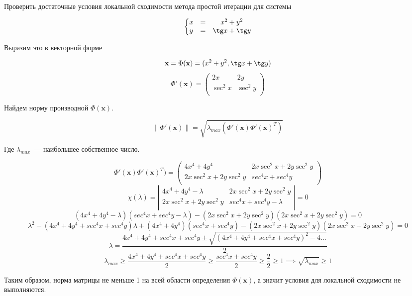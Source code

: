 \documentclass[11pt,a4paper,oneside]{article}
\newcommand{\norm}[1]{\left\lVert#1\right\rVert}
\begin{document}
\begin{problem}
Проверить достаточные условия локальной сходимости метода простой итерации для системы
	
$$
\left\{\begin{matrix}
	x & = & x^2 + y^2 \\
	y & = & \tg x + \tg y \\
\end{matrix} \right.
$$
\end{problem}

Выразим это в векторной форме

$$ \mathbf{x} = \Phi(\mathbf{x}) = (x^2 + y^2, \tg x + \tg y) $$
$$ \Phi'(\mathbf{x}) = \left(\begin{matrix}
	2x & 2y \\
	\sec^2 x & \sec^2 y \\
\end{matrix}\right) $$

Найдем норму производной $\Phi(\mathbf{x})$.

$$ \norm{\Phi'(\mathbf{x})} = \sqrt{\lambda_{max}(\Phi'(\mathbf{x}) \Phi'(\mathbf{x})^T)} $$

Где $\lambda_{max}$~--- наибольшее собственное число.

$$ \Phi'(\mathbf{x}) \Phi'(\mathbf{x})^T) = \left( \begin{matrix}
	4 x^4 + 4 y^4 & 2x \sec^2 x + 2y \sec^2 y \\
	2x \sec^2 x + 2y \sec^2 y & sec^4 x + sec^4 y \\
\end{matrix} \right) $$
$$ \chi(\lambda) = \left| \begin{matrix}
	4 x^4 + 4 y^4 - \lambda & 2x \sec^2 x + 2y \sec^2 y \\
	2x \sec^2 x + 2y \sec^2 y & sec^4 x + sec^4 y - \lambda \\
\end{matrix} \right| = 0 $$
$$ (4 x^4 + 4 y^4 - \lambda) (sec^4 x + sec^4 y - \lambda) - (2x \sec^2 x + 2y \sec^2 y) (2x \sec^2 x + 2y \sec^2 y) = 0 $$
$$ \lambda^2 - (4 x^4 + 4 y^4 + sec^4 x + sec^4 y) \lambda + (4 x^4 + 4 y^4) (sec^4 x + sec^4 y) - (2x \sec^2 x + 2y \sec^2 y) (2x \sec^2 x + 2y \sec^2 y) = 0 $$
$$ \lambda = \frac{4 x^4 + 4 y^4 + sec^4 x + sec^4 y \pm \sqrt{(4 x^4 + 4 y^4 + sec^4 x + sec^4 y)^2 - 4 \dots}}{2} $$
$$ \lambda_{max} \ge \frac{4 x^4 + 4 y^4 + sec^4 x + sec^4 y}{2}
	\ge \frac{sec^4 x + sec^4 y}{2} \ge \frac{2}{2} \ge 1 \implies \sqrt{\lambda_{max}} \ge 1 $$
	
Таким образом, норма матрицы не меньше 1 на всей области определения $\Phi(\mathbf{x})$, а значит условия для локальной сходимости не выполняются.
\end{document}

